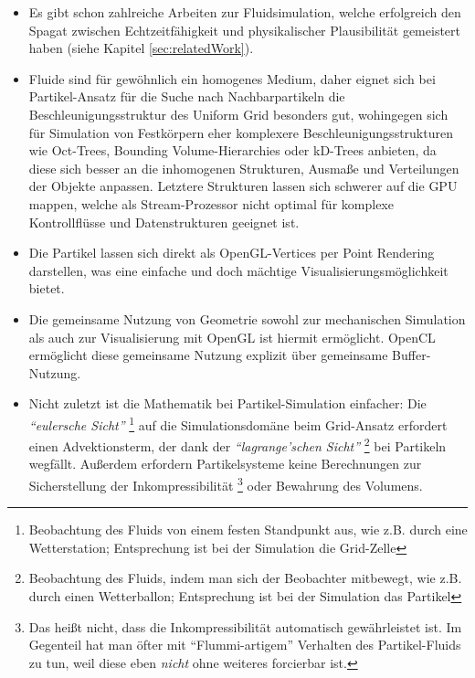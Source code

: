 	\begin{itemize}
 	\item Es gibt schon zahlreiche Arbeiten zur Fluidsimulation, welche erfolgreich den Spagat zwischen Echtzeitfähigkeit 
 	und physikalischer Plausibilität gemeistert haben (siehe Kapitel \ref{sec:relatedWork}).
 	\item Fluide sind für gewöhnlich ein homogenes Medium, daher eignet sich bei Partikel-Ansatz für die Suche nach 
 	Nachbarpartikeln die \linebreak Beschleunigungsstruktur des Uniform Grid besonders gut, wohingegen sich für Simulation 
 	von Festkörpern eher komplexere Beschleunigungsstrukturen wie Oct-Trees, Bounding Volume-Hierarchies oder kD-Trees 
 	anbieten, da diese sich besser an die inhomogenen Strukturen, Ausmaße und Verteilungen der Objekte anpassen.	
 	Letztere Strukturen lassen sich schwerer auf die GPU mappen, welche als Stream-Prozessor nicht optimal für komplexe 
	Kontrollflüsse und Datenstrukturen geeignet ist.
	\item Die Partikel lassen sich direkt als OpenGL-Vertices per Point Rendering darstellen, was eine einfache und doch 
	mächtige Visualisierungsmöglichkeit bietet.
	\item Die gemeinsame Nutzung von Geometrie sowohl zur mechanischen Simulation als auch zur Visualisierung mit OpenGL
	ist hiermit ermöglicht. OpenCL ermöglicht diese gemeinsame Nutzung explizit über gemeinsame Buffer-Nutzung.
	\item Nicht zuletzt ist die Mathematik bei Partikel-Simulation einfacher: 
	Die \emph{"`eulersche Sicht"'}
	\footnote{Beobachtung des Fluids von einem festen Standpunkt aus, wie z.B. durch eine Wetterstation;
	 	Entsprechung ist bei der Simulation die Grid-Zelle}	 
	auf die Simulationsdomäne beim Grid-Ansatz erfordert einen Advektionsterm, 
	der dank der \emph{"`lagrange'schen Sicht"'} 
	\footnote{Beobachtung des Fluids, indem man sich der Beobachter mitbewegt, wie z.B. durch einen Wetterballon;
		Entsprechung ist bei der Simulation das Partikel}	
	bei Partikeln wegfällt. Außerdem erfordern Partikelsysteme keine Berechnungen zur Sicherstellung der
	Inkompressibilität
	\footnote{
		Das heißt nicht, dass die Inkompressibilität automatisch gewährleistet ist. Im Gegenteil 
		hat man öfter mit "`Flummi-artigem"' Verhalten des Partikel-Fluids zu tun, weil diese eben \emph{nicht} ohne 
		weiteres forcierbar ist.
	} 
	oder Bewahrung des Volumens.

	\end{itemize}


\clearpage
